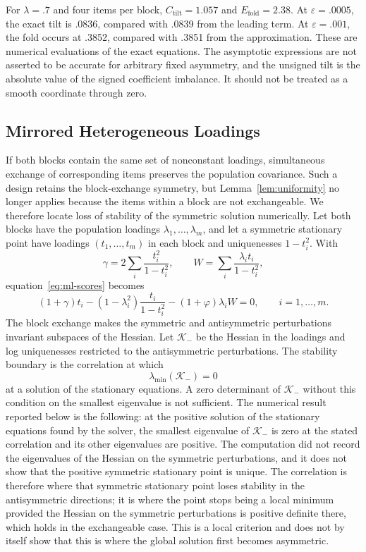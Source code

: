 For $\lambda=.7$ and four items per block, $C_{\mathrm{tilt}}=1.057$ and $E_{\mathrm{fold}}=2.38$. At $\varepsilon=.0005$, the exact tilt is .0836, compared with .0839 from the leading term. At $\varepsilon=.001$, the fold occurs at .3852, compared with .3851 from the approximation. These are numerical evaluations of the exact equations. The asymptotic expressions are not asserted to be accurate for arbitrary fixed asymmetry, and the unsigned tilt is the absolute value of the signed coefficient imbalance. It should not be treated as a smooth coordinate through zero.

\subsection{Mirrored Heterogeneous Loadings}
\label{app:mirrored}

If both blocks contain the same set of nonconstant loadings, simultaneous exchange of corresponding items preserves the population covariance. Such a design retains the block-exchange symmetry, but Lemma~\ref{lem:uniformity} no longer applies because the items within a block are not exchangeable. We therefore locate loss of stability of the symmetric solution numerically. Let both blocks have the population loadings $\lambda_1,\ldots,\lambda_m$, and let a symmetric stationary point have loadings $(t_1,\ldots,t_m)$ in each block and uniquenesses $1-t_i^2$. With
\[
\gamma=2\sum_i\frac{t_i^2}{1-t_i^2},\qquad W=\sum_i\frac{\lambda_it_i}{1-t_i^2},
\]
equation~\eqref{eq:ml-scores} becomes
\[
(1+\gamma)t_i-(1-\lambda_i^2)\frac{t_i}{1-t_i^2}-(1+\varphi)\lambda_iW=0,\qquad i=1,\ldots,m .
\]
The block exchange makes the symmetric and antisymmetric perturbations invariant subspaces of the Hessian. Let $\mathcal K_-$ be the Hessian in the loadings and log uniquenesses restricted to the antisymmetric perturbations. The stability boundary is the correlation at which
\[
\lambda_{\min}(\mathcal K_-)=0
\]
at a solution of the stationary equations. A zero determinant of $\mathcal K_-$ without this condition on the smallest eigenvalue is not sufficient. The numerical result reported below is the following: at the positive solution of the stationary equations found by the solver, the smallest eigenvalue of $\mathcal K_-$ is zero at the stated correlation and its other eigenvalues are positive. The computation did not record the eigenvalues of the Hessian on the symmetric perturbations, and it does not show that the positive symmetric stationary point is unique. The correlation is therefore where that symmetric stationary point loses stability in the antisymmetric directions; it is where the point stops being a local minimum provided the Hessian on the symmetric perturbations is positive definite there, which holds in the exchangeable case. This is a local criterion and does not by itself show that this is where the global solution first becomes asymmetric.

